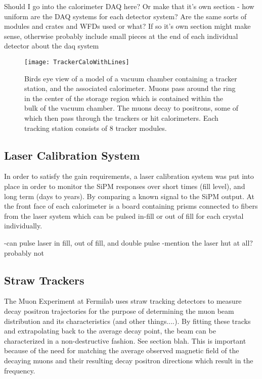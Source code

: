 Should I go into the calorimeter DAQ here? Or make that it's own section - how uniform are the DAQ systems for each detector system? Are the same sorts of modules and crates and WFDs used or what? If so it's own section might make sense, otherwise probably include small pieces at the end of each individual detector about the daq system

\begin{figure}[]
    \centering
    \texttt{[image: TrackerCaloWithLines]}
    \caption[TrackerCaloWithLines]{Birds eye view of a model of a vacuum chamber containing a tracker station, and the associated calorimeter. Muons pass around the ring in the center of the storage region which is contained within the bulk of the vacuum chamber. The muons decay to positrons, some of which then pass through the trackers or hit calorimeters. Each tracking station consists of 8 tracker modules.}   
    \label{fig:TrackerCaloWithLines}
\end{figure}



\subsection{Laser Calibration System}
\label{LaserCalibrationSystem}

In order to satisfy the gain requirements, a laser calibration system was put into place in order to monitor the SiPM responses over short times (fill level), and long term (days to years). By comparing a known signal to the SiPM output. At the front face of each calorimeter is a board containing prisms connected to fibers from the laser system which can be pulsed in-fill or out of fill for each crystal individually. 


-can pulse laser in fill, out of fill, and double pulse
-mention the laser hut at all? probably not


\cite{Anastasi:2015ssy}
\cite{Anastasi:2016luh}
\cite{Anastasi:2017sos}




\subsection{Straw Trackers}
\label{sec:StrawTrackers}

The Muon \gmtwo Experiment at Fermilab uses straw tracking detectors to measure decay positron trajectories for the purpose of determining the muon beam distribution and its characteristics (and other things....). By fitting these tracks and extrapolating back to the average decay point, the beam can be characterized in a non-destructive fashion. See section blah. This is important because of the need for matching the average observed magnetic field of the decaying muons and their resulting decay positron directions which result in the \wa frequency.

